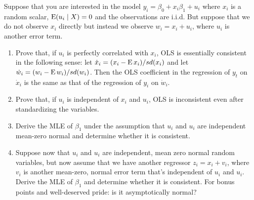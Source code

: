 \begin{hw}
  Suppose that you are interested in the model $y_i = \beta_0 +
  x_i\beta_1 + u_i$ where $x_i$ is a random scalar, $\operatorname{E}(u_i \mid X) =
  0$ and the observations are i.i.d. But suppose that we do not
  observe $x_i$ directly but instead we observe $w_i = x_i + u_i$,
  where $u_i$ is another error term.
  \begin{enumerate}
  \item Prove that, if $u_i$ is perfectly correlated with $x_i$, OLS
    is essentially consistent in the following sense: let $\dot x_i =
    (x_i - \operatorname{E} x_i) / sd(x_i)$ and let $\dot w_i = (w_i - \operatorname{E} w_i) /
    sd(w_i)$. Then the OLS coefficient in the regression of $y_t$ on
    $\dot x_i$ is the same as that of the regression of $y_i$ on $\dot
    w_i$.
  \item Prove that, if $u_i$ is independent of $x_i$ and $u_i$, OLS is
    inconsistent even after standardizing the variables.
  \item Derive the MLE of $\beta_1$ under the assumption that $u_i$ and
    $u_i$ are independent mean-zero normal and determine whether it is
    consistent.
  \item Suppose now that $u_i$ and $u_i$ are independent, mean zero
    normal random variables, but now assume that we have another
    regressor $z_i = x_i + v_i$, where $v_i$ is another mean-zero,
    normal error term that's independent of $u_i$ and $u_i$. Derive
    the MLE of $\beta_1$ and determine whether it is consistent. For bonus
    points and well-deserved pride: is it asymptotically normal?
  \end{enumerate}
\end{hw}

